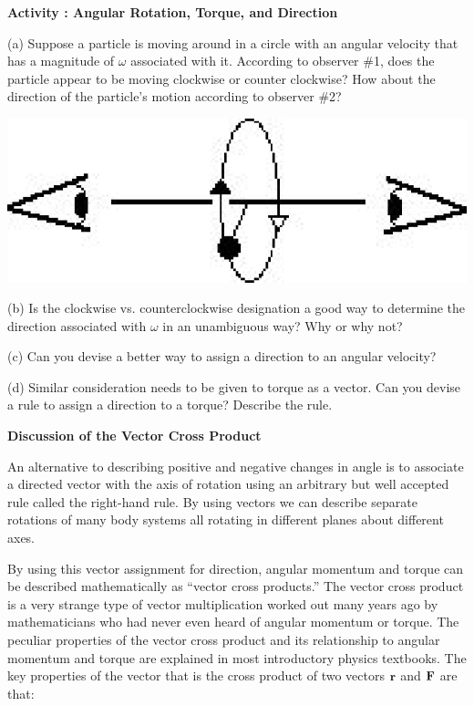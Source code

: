 \textbf{Activity  : Angular Rotation, Torque, and Direction }

(a) Suppose a particle is moving around in a circle with an angular velocity
that has a magnitude of \( \omega  \) associated with it. According to observer
\#1, does the particle appear to be moving clockwise or counter clockwise? How
about the direction of the particle's motion according to observer \#2?

\vspace{0.3cm}
{\par\raggedright \includegraphics{ang_mom/ang_mom_fig2.eps} \par}
\vspace{0.3cm}

(b) Is the clockwise vs. counterclockwise designation a good way to determine
the direction associated with $\omega$ in an unambiguous way? Why or why not? 
\vspace{20mm}

(c) Can you devise a better way to assign a direction to an angular
velocity?
\vspace{20mm}

(d) Similar consideration needs to be given to torque as a vector. Can you devise
a rule to assign a direction to a torque? Describe the rule.
\vspace{20mm}

\textbf{Discussion of the Vector Cross Product }

An alternative to describing positive and negative changes in angle is to associate
a directed vector with the axis of rotation using an arbitrary but
well accepted rule called the right-hand rule. By using vectors we can describe
separate rotations of many body systems all rotating in different planes about
different axes. 

By using this vector assignment for direction, angular momentum and torque can
be described mathematically as ``vector cross products.'' The
vector cross product is a very strange type of vector multiplication worked
out many years ago by mathematicians who had never even heard of angular momentum or torque. The peculiar properties of the vector cross product and its relationship to angular momentum and torque are explained in most introductory physics textbooks.
The key properties of the vector that is the cross product of two vectors \( 
{\bf r} \)
and \( {\bf F} \) are that:

